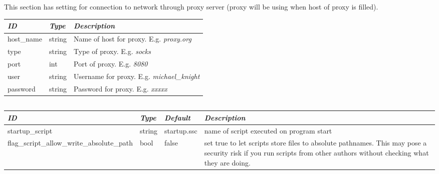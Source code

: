 \subsection{}
This section has setting for connection to network through proxy server (proxy will be using when host of proxy is filled).

\noindent%
\begin{tabularx}{\textwidth}{l|l|X}\toprule
\emph{ID}  & \emph{Type} & \emph{Description}\\\midrule
host\_name & string & Name of host for proxy. E.g. \emph{proxy.org}\\%
type	   & string & Type of proxy. E.g. \emph{socks}\\%
port       & int    & Port of proxy. E.g. \emph{8080}\\%
user       & string & Username for proxy. E.g. \emph{michael\_knight}\\%
password   & string & Password for proxy. E.g. \emph{xxxxx}\\\bottomrule
\end{tabularx}

\subsection{}

\begin{tabularx}{\textwidth}{l|l|l|X}\toprule
\emph{ID}                  & \emph{Type} & \emph{Default} & \emph{Description}\\\midrule
startup\_script                            & string & startup.ssc & name of script executed on program start\\
flag\_script\_allow\_write\_absolute\_path & bool   & false       & set true to let scripts store files to absolute pathnames.
                                                                    This may pose a security risk if you run scripts from other authors
                                                                    without checking what they are doing.\\\bottomrule 
\end{tabularx}

